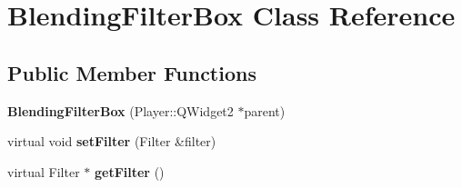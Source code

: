 \hypertarget{classBlendingFilterBox}{}\section{Blending\+Filter\+Box Class Reference}
\label{classBlendingFilterBox}
\subsection*{Public Member Functions}
\begin{DoxyCompactItemize}
\item 
\hypertarget{classBlendingFilterBox_aa612245c25774e1aa026501a4c534487}{}{\bfseries Blending\+Filter\+Box} (Player\+::\+Q\+Widget2 $\ast$parent)\label{classBlendingFilterBox_aa612245c25774e1aa026501a4c534487}

\item 
\hypertarget{classBlendingFilterBox_a09e99b0db09b8468ce7d7e0f98293ac5}{}virtual void {\bfseries set\+Filter} (Filter \&filter)\label{classBlendingFilterBox_a09e99b0db09b8468ce7d7e0f98293ac5}

\item 
\hypertarget{classBlendingFilterBox_ad7b14770615490d1445c958c79fd3adb}{}virtual Filter $\ast$ {\bfseries get\+Filter} ()\label{classBlendingFilterBox_ad7b14770615490d1445c958c79fd3adb}

\end{DoxyCompactItemize}
